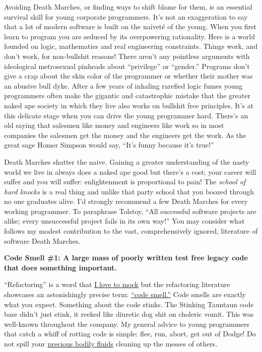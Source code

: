Avoiding Death Marches, or finding ways to shift blame for them, is an
essential survival skill for young corporate programmers. It's not an
exaggeration to say that a lot of modern software is built on the
naiveté of the young. When you first learn to program you are seduced by
its overpowering rationality. Here is a world founded on logic,
mathematics and real engineering constraints. Things work, and don't
work, for non-bullshit reasons! There aren't any pointless arguments
with ideological metrosexual pinheads about ``privilege'' or ``gender.''
Programs don't give a crap about the skin color of the programmer or
whether their mother was an abusive bull dyke. After a few years of
inhaling rarefied logic fumes young programmers often make the gigantic
and catastrophic mistake that the greater naked ape society in which
they live also works on bullshit free principles. It's at this delicate
stage when you can drive the young programmer hard. There's an old
saying that salesmen like money and engineers like work so in most
companies the salesmen get the money and the engineers get the work. As
the great sage Homer Simpson would say, ``It's funny because it's
true!''

Death Marches shatter the naive. Gaining a greater understanding of the
nasty world we live in always does a naked ape good but there's a cost;
your career will suffer and you will suffer: enlightenment is
proportional to pain! The \emph{school of hard knocks} is a real thing and
unlike that party school that you boozed through no one graduates alive.
I'd strongly recommend a few Death Marches for every working programmer.
To paraphrase Tolstoy, ``All successful software projects are alike;
every unsuccessful project fails in its own way!'' You may consider what
follows my modest contribution to the vast, comprehensively ignored,
literature of software Death Marches.

\medskip
\noindent\textbf{Code Smell \#1: A large mass of poorly written test free legacy
code that does something important.}
\medskip

``Refactoring'' is a word that
\href{https://bakerjd99.wordpress.com/2010/01/28/why-code-when-you-can-steal/}{I
love to mock} but the refactoring literature showcases an astonishingly
precise term: \href{http://en.wikipedia.org/wiki/Code_smell}{``code
smell.''} Code smells are exactly what you expect. Something about the
code stinks. The Stinking Tauntaun code base didn't just stink, it
reeked like diuretic dog shit on choleric vomit. This was well-known
throughout the company. My general advice to young programmers that
catch a whiff of rotting code is simple: flee, run, abort, get out of
Dodge! Do not spill your
\href{https://www.youtube.com/watch?v=N1KvgtEnABY}{precious bodily
fluids} cleaning up the messes of others.

